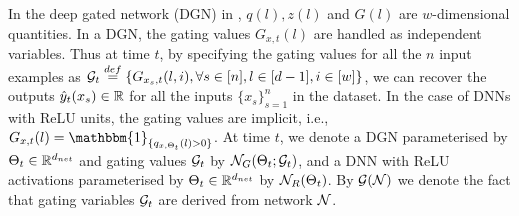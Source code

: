 In the deep gated network (DGN) in , $q(l),z(l)$ and $G(l)$ are $w$-dimensional quantities. In a DGN, the gating values $G_{x,t}(l)$ are handled as independent variables. Thus at time $t$, by specifying the gating values for all the $n$ input examples as $\mathcal{G}_t\stackrel{def}=\{G_{x_{s},t}(l,i), \forall s\in[n],l\in[d-1],i\in[w]\}$, we can recover the outputs $\hat{y}_t(x_s)\in \mathbb{R}$ for all the inputs $\{x_s\}_{s=1}^n$ in the dataset. In the case of DNNs with ReLU units, the gating values are implicit, i.e., $G_{x,t}(l)=\mathbbm{1}_{\{q_{x,\Theta_t}(l)>0\}}$. At time $t$, we denote a DGN parameterised by $\Theta_t\in \mathbb{R}^{d_{net}}$ and gating values $\mathcal{G}_t$ by $\mathcal{N}_G(\Theta_t;\mathcal{G}_t)$, and a DNN with ReLU activations parameterised by $\Theta_t\in\mathbb{R}^{d_{net}}$ by $\mathcal{N}_R(\Theta_t)$. By $\mathcal{G}(\mathcal{N})$ we denote the fact that gating variables  $\mathcal{G}_t$ are derived from network $\mathcal{N}$.




